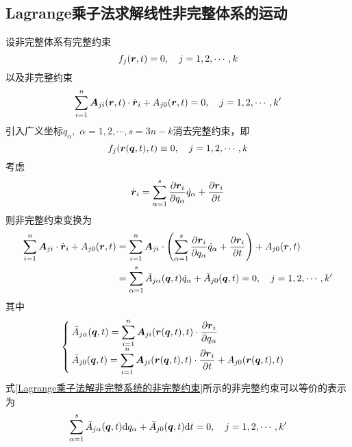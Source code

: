 \subsection{Lagrange乘子法求解线性非完整体系的运动}

设非完整体系有完整约束
\begin{equation*}
	f_j (\boldsymbol{r},t) = 0,\quad j = 1,2,\cdots,k
\end{equation*}
以及非完整约束
\begin{equation*}
	\sum_{i=1}^n \boldsymbol{A}_{ji}(\boldsymbol{r},t) \cdot \dot{\boldsymbol{r}}_i + A_{j0}(\boldsymbol{r},t) = 0,\quad j = 1,2,\cdots,k'
\end{equation*}
引入广义坐标$q_\alpha,\,\,\alpha = 1,2,\cdots,s=3n-k$消去完整约束，即
\begin{equation*}
	f_j(\boldsymbol{r}(\boldsymbol{q},t),t) \equiv 0,\quad j=1,2,\cdots,k
\end{equation*}
考虑
\begin{equation*}
	\dot{\boldsymbol{r}}_i = \sum_{\alpha=1}^s \frac{\partial \boldsymbol{r}_i}{\partial q_\alpha} \dot{q}_\alpha + \frac{\partial \boldsymbol{r}_i}{\partial t}
\end{equation*}
则非完整约束变换为
\begin{align}
	\sum_{i=1}^n \boldsymbol{A}_{ji} \cdot \dot{\boldsymbol{r}}_i + A_{j0}(\boldsymbol{r},t) & = \sum_{i=1}^n \boldsymbol{A}_{ji} \cdot \left(\sum_{\alpha=1}^s \frac{\partial \boldsymbol{r}_i}{\partial q_\alpha} \dot{q}_\alpha + \frac{\partial \boldsymbol{r}_i}{\partial t}\right) + A_{j0}(\boldsymbol{r},t) \nonumber \\
	& = \sum_{\alpha=1}^s \bar{A}_{j\alpha}(\boldsymbol{q},t) \dot{q}_\alpha + \bar{A}_{j0}(\boldsymbol{q},t) = 0,\quad j=1,2,\cdots,k'
	\label{Lagrange乘子法解非完整系统的非完整约束}
\end{align}
其中
\begin{equation*}
	\begin{cases}
		\displaystyle \bar{A}_{j\alpha}(\boldsymbol{q},t) = \sum_{i=1}^n \boldsymbol{A}_{ji}(\boldsymbol{r}(\boldsymbol{q},t),t) \cdot \frac{\partial \boldsymbol{r}_i}{\partial q_\alpha} \\[1.5ex]
		\displaystyle \bar{A}_{j0}(\boldsymbol{q},t) = \sum_{i=1}^n \boldsymbol{A}_{ji}(\boldsymbol{r}(\boldsymbol{q},t),t) \cdot \frac{\partial \boldsymbol{r}_i}{\partial t} + A_{j0}(\boldsymbol{r}(\boldsymbol{q},t),t)
	\end{cases}
\end{equation*}
式\eqref{Lagrange乘子法解非完整系统的非完整约束}所示的非完整约束可以等价的表示为
\begin{align}
	\sum_{\alpha=1}^s \bar{A}_{j\alpha}(\boldsymbol{q},t) \mathrm{d} q_\alpha + \bar{A}_{j0}(\boldsymbol{q},t) \mathrm{d} t = 0,\quad j=1,2,\cdots,k'
\end{align}
